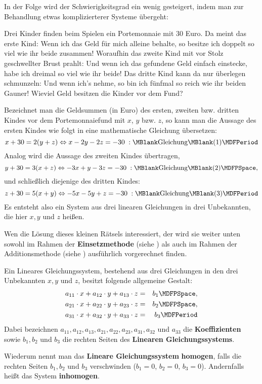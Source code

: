 \begin{MIntro}
In der Folge wird der Schwierigkeitsgrad ein wenig gesteigert, indem man zur Behandlung etwas komplizierterer
Systeme übergeht:
\begin{MExample}
Drei Kinder finden beim Spielen ein Portemonnaie mit $30$ Euro. Da meint das erste Kind: \glqq Wenn ich
das Geld für mich alleine behalte, so besitze ich doppelt so viel wie ihr beide zusammen!{\grqq} Woraufhin das
zweite Kind mit vor Stolz geschwellter Brust prahlt: \glqq Und wenn ich das gefundene Geld einfach einstecke, habe
ich dreimal so viel wie ihr beide!{\grqq} Das dritte Kind kann da nur überlegen schmunzeln: \glqq Und wenn ich's
nehme, so bin ich fünfmal so reich wie ihr beiden Gauner!{\grqq} Wieviel Geld besitzen die Kinder vor dem Fund?

Bezeichnet man die Geldsummen (in Euro) des ersten, zweiten bzw. dritten Kindes vor dem Portemonnaiefund
mit $x$, $y$ bzw. $z$, so kann man die Aussage des ersten Kindes wie folgt in eine mathematische Gleichung
übersetzen:
$$x + 30 = 2 (y + z) \Leftrightarrow x - 2 y - 2 z = - 30 \; : \MBlank\mbox{Gleichung}\MBlank (1) \MDFPeriod$$
Analog wird die Aussage des zweiten Kindes übertragen,
$$y + 30 = 3 (x + z) \Leftrightarrow - 3 x + y - 3 z = - 30 \; : \MBlank\mbox{Gleichung}\MBlank (2) \MDFPSpace ,$$
und schließlich diejenige des dritten Kindes:
$$z + 30 = 5 (x + y) \Leftrightarrow - 5 x - 5 y + z = - 30 \; : \MBlank\mbox{Gleichung}\MBlank (3) \MDFPeriod$$
Es entsteht also ein System aus drei linearen Gleichungen in drei Unbekannten, die hier $x, y$ und $z$ heißen.
\end{MExample}
Wen die Lösung dieses kleinen Rätsels interessiert, der wird sie weiter unten sowohl im Rahmen der
\textbf{Einsetzmethode} (siehe ) als auch im Rahmen der Additionsmethode
(siehe ) ausführlich vorgerechnet finden.
\begin{MInfo}
Ein Lineares Gleichungssystem, bestehend aus drei Gleichungen in den drei
Unbekannten $x, y$ und $z$, besitzt folgende allgemeine Gestalt:
\begin{eqnarray*}
a_{11} \cdot x + a_{12} \cdot y + a_{13} \cdot z & = & b_1 \MDFPSpace, \\
a_{21} \cdot x + a_{22} \cdot y + a_{23} \cdot z & = & b_2 \MDFPSpace, \\
a_{31} \cdot x + a_{32} \cdot y + a_{33} \cdot z & = & b_3 \MDFPeriod
\end{eqnarray*}
Dabei bezeichnen $a_{11}, a_{12}, a_{13}, a_{21}, a_{22}, a_{23}, a_{31}, a_{32}$ und $a_{33}$ die
\textbf{Koeffizienten} sowie $b_1, b_2$ und $b_3$ die rechten Seiten des \textbf{Linearen Gleichungssystems}.

Wiederum nennt man das \textbf{Lineare Gleichungssystem} \textbf{homogen}, falls die rechten Seiten $b_1, b_2$
und $b_3$ verschwinden ($b_1 = 0$, $b_2 = 0$, $b_3 = 0$). Andernfalls heißt das System \textbf{inhomogen}.
\end{MInfo}
\end{MIntro}

